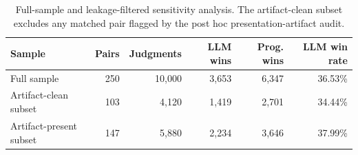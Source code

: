 \documentclass[11pt]{article}
\begin{document}
\begin{table}[H]
\centering
\small
\begin{tabular}{lrrrrr}
\toprule
Sample & Pairs & Judgments & LLM wins & Prog. wins & LLM win rate \\
\midrule
Full sample & 250 & 10,000 & 3,653 & 6,347 & 36.53\% \\
Artifact-clean subset & 103 & 4,120 & 1,419 & 2,701 & 34.44\% \\
Artifact-present subset & 147 & 5,880 & 2,234 & 3,646 & 37.99\% \\
\bottomrule
\end{tabular}
\caption{Full-sample and leakage-filtered sensitivity analysis. The artifact-clean subset excludes any matched pair flagged by the post hoc presentation-artifact audit.}
\label{tab:leakage-app}
\end{table}
\end{document}
